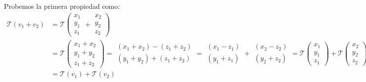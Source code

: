 \documentclass[12pt]{report}                                %
\begin{document}
            Probemos la primera propiedad como:
            \begin{equation*}
            \begin{split}
                \mathscr{T} (v_1 + v_2) & =
                \mathscr{T} \left( \begin{matrix} x_1\\y_1\\z_1 \end{matrix} + \begin{matrix} x_2\\y_2\\z_2 \end{matrix} \right)
                \\
                & = \mathscr{T} \left( \begin{matrix} x_1+x_2\\y_1+y_2\\z_1+z_2 \end{matrix} \right)
                  = \begin{matrix} (x_1+x_2)-(z_1+z_2) \\ (y_1+y_2)+(z_1+z_2) \end{matrix}
                  = \begin{matrix}(x_1-z_1)\\(y_1+z_1)\end{matrix} + \begin{matrix}(x_2-z_2)\\(y_2+z_2)\end{matrix} 
                  = 
                  \mathscr{T} \left(\begin{matrix} x_1\\y_1\\z_1 \end{matrix} \right)
                  +
                  \mathscr{T} \left( \begin{matrix} x_2\\y_2\\z_2 \end{matrix} \right)            
                \\
                & = \mathscr{T}(v_1) + \mathscr{T}(v_2)
            \end{split}
            \end{equation*}
\end{document}

